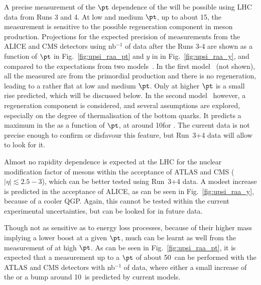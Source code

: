 \documentclass[../report.tex]{subfiles}
\begin{document}
A precise measurement of the $\pt$ dependence of the  \raa will be possible using LHC data from Runs 3 and 4. At low and medium $\pt$, up to about 15\UGeV, the measurement is
sensitive to the possible regeneration component in \PGU meson production. Projections for the expected precision of \PGU measurements from the ALICE and CMS detectors
using \unit[10]{nb}$^{-1}$ of data after the Runs 3-4 are shown as a function of $\pt$ in Fig.~\ref{fig:upsi_raa_pt} and $y$ in in Fig.~\ref{fig:upsi_raa_y}, and compared to the expectations from two 
models~\cite{Krouppa:2017jlg,Du:2017qkv}. In the first model~\cite{Krouppa:2017jlg} (not shown), all the measured \PGU are from the primordial production and there is no regeneration, leading
to a rather flat \raa at low and medium $\pt$. Only at higher $\pt$ is a small rise predicted, which will be discussed below. In the second model~\cite{Du:2017qkv} however, a regeneration
component is considered, and several assumptions are explored, especially on the degree of thermalisation of the bottom quarks. 
It predicts a maximum in the \raa as a function of $\pt$, at around 10\UGeVc for . The current data is not precise enough to confirm or disfavour this feature, but Run~3+4 
data will allow to look for it.

Almost no rapidity dependence is expected at the LHC for the nuclear modification factor of \PGU mesons within the acceptance of ATLAS and CMS ($|\eta|\lesssim 2.5-3$), which can be better
tested using Run~3+4 data. A modest increase is predicted in the acceptance of ALICE, as can be seen in Fig.~\ref{fig:upsi_raa_y}, because of a cooler QGP. Again, this cannot be tested
within the current experimental uncertainties, but can be looked for in future data.

Though not as sensitive as \PJgy to energy loss processes, because of their higher mass implying a lower boost at a given $\pt$, much can be learnt as well from the measurement of
 at high $\pt$. As can be seen in Fig.~\ref{fig:upsi_raa_pt}, it is expected that a measurement up to a $\pt$ of about 50\UGeVc\ can be performed with the ATLAS and CMS detectors with
\unit[10]{nb}$^{-1}$ of data, where either a small increase of the \raa or a bump around 10\UGeVc\ is predicted by current models.
\end{document}
